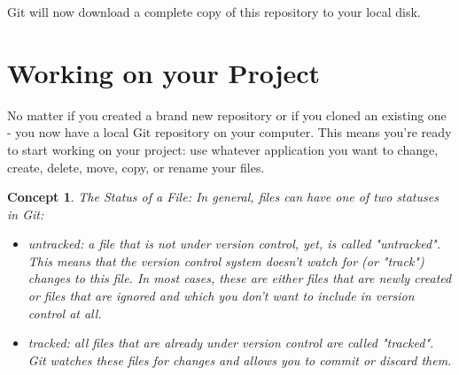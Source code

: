 \documentclass{article}
\begin{document}
Git will now download a complete copy of this repository to your local disk.

\section{Working on your Project}
No matter if you created a brand new repository or if you cloned an existing one - you now have a local Git repository on your computer. This means you're ready to start working on your project: use whatever application you want to change, create, delete, move, copy, or rename your files.

 \newtheorem*{concept}{Concept}
 \begin{concept}
The Status of a File: 
\newline\newline
In general, files can have one of two statuses in Git:
\begin{itemize}
    \item untracked: a file that is not under version control, yet, is called "untracked". This means that the version control system doesn't watch for (or "track") changes to this file. In most cases, these are either files that are newly created or files that are ignored and which you don't want to include in version control at all.
    \item tracked: all files that are already under version control are called "tracked". Git watches these files for changes and allows you to commit or discard them.
\end{itemize}
 \end{concept}
\end{document}
